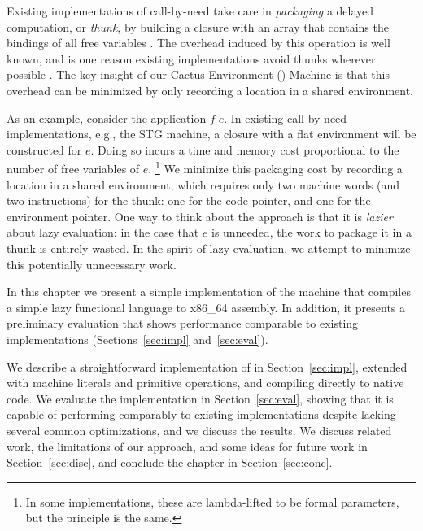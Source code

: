 Existing implementations of call-by-need take care in \emph{packaging} a delayed
computation, or \emph{thunk}, by building a closure with an array that contains
the bindings of all free variables \cite{jonesstg,boquist1997grin}. The overhead
induced by this operation is well known, and is one reason existing
implementations avoid thunks wherever possible \cite{johnsson1984efficient}. The
key insight of our Cactus Environment (\ce) Machine is that this overhead can be
minimized by only recording a location in a shared environment.

As an example, consider the application $f \; e$. In existing call-by-need
implementations, e.g., the STG machine\cite{jonesstg}, a closure with a flat
environment will be constructed for $e$.  Doing so incurs a time and memory cost
proportional to the number of free variables of $e$. \footnote{In some
implementations, these are lambda-lifted to be formal parameters, but the
principle is the same.} We minimize this packaging cost by recording a
location in a shared environment, which requires only two
machine words (and two instructions) for the thunk: one for the code pointer,
and one for the environment pointer. One way to think about the approach is that
it is \emph{lazier} about lazy evaluation: in the case that $e$ is unneeded, the
work to package it in a thunk is entirely wasted. In the spirit of lazy
evaluation, we attempt to minimize this potentially unnecessary work.  

In this chapter we present a simple implementation of the \ce machine that
compiles a simple lazy functional language to x86\_64 assembly. In addition, it
presents a preliminary evaluation that shows performance comparable to existing
implementations (Sections~\ref{sec:impl} and~\ref{sec:eval}). 

We describe a straightforward
implementation of \ce in Section~\ref{sec:impl}, extended with machine literals
and primitive operations, and compiling directly to native code. We evaluate the
implementation in Section~\ref{sec:eval}, showing that it is capable of
performing comparably to existing implementations despite lacking several common
optimizations, and we discuss the results. We discuss related work, the
limitations of our approach, and some ideas for future work in
Section~\ref{sec:disc}, and conclude the chapter in Section~\ref{sec:conc}.


